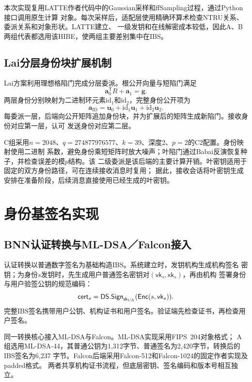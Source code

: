 本次实现复用LATTE作者代码中的Gaussian采样和ffSampling过程，通过Python接口调用原生计算
对象。每次采样后，适配层使用精确环算术检查NTRU关系、委派关系和对象形状。LATTE建立、
一级发钥和在线解密成本较低，因此A、B两组代表都选用该HIBE，使两组主要差别集中在IBS。

\subsection{Lai分层身份块扩展机制}

Lai方案利用理想格陷门完成分层委派\cite{lai2015trapdoors}。根公开向量与短陷门满足
\[
 \mathbf a_0^{\mathsf T}R+\mathbf a_1=\mathbf g.
\]
两层身份分别映射为二进制环元素$\mathrm{id}_1$和$\mathrm{id}_2$，完整身份公开项为
\[
 \mathbf a_{\mathrm{ID}}
 =\mathbf u_0+\mathrm{id}_1\mathbf u_1+\mathrm{id}_2\mathbf u_2.
\]
每委派一层，后端向公开矩阵追加身份块，并为扩展后的矩阵生成新陷门。接收身份对应第一层，认可
发送身份对应第二层。

C组采用$n=2048$、$q=274877976577$、$k=39$、深度2、$p=2$的C2配置。身份映射使用二进制
系数，避免身份乘短矩阵时放大噪声；叶陷门通过Babai反演恢复种子，并检查误差的模$p$结构。该
二级委派是该后端的主要计算开销。叶密钥适用于固定的双方身份路径，可在连续接收消息时复用；
据此，接收会话将叶密钥生成安排在准备阶段，后续消息直接使用已经生成的叶密钥。

\section{身份基签名实现}

\subsection{BNN认证转换与ML-DSA／Falcon接入}

认证转换以普通数字签名为基础构造IBS\cite{galindo2006ibs}。系统建立时，发钥机构生成机构签名
密钥；为身份$s$发钥时，先生成用户普通签名密钥对$(\mathsf{vk}_s,\mathsf{xk}_s)$，再由机构
签署身份与用户验签公钥的规范编码：
\[
 \mathsf{cert}_s=\mathsf{DS.Sign}_{\mathsf{sk}_{\rm CA}}
       (\mathsf{Enc}(s,\mathsf{vk}_s)).
\]
完整IBS签名携带用户公钥、机构证书和用户签名。验证端先检查证书，再检查用户签名。

同一转换核心接入ML-DSA与Falcon。ML-DSA实现采用FIPS~204对象格式\cite{nist2024fips204}；
A组选用ML-DSA-44，其普通公钥为1,312字节、普通签名为2,420字节，转换后的IBS签名为6,237
字节。Falcon后端采用Falcon-512和Falcon-1024的固定作者实现及padded格式\cite{falcon2020}。
两者共享机构证书流程，但底层密钥、签名编码和版本号相互独立。

